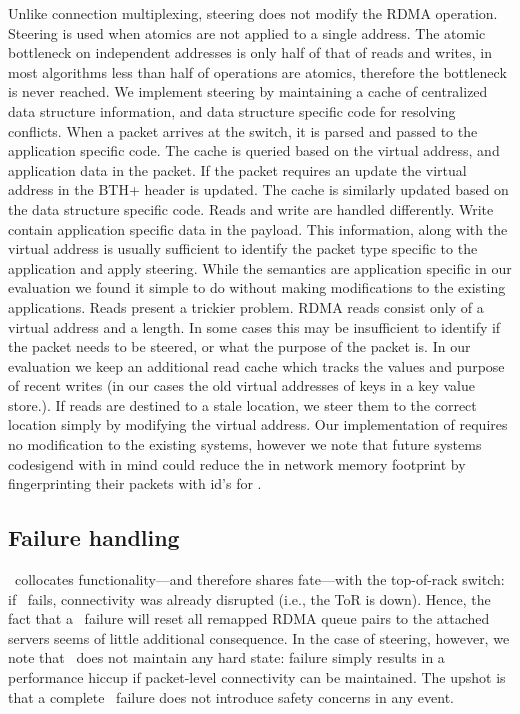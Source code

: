 Unlike connection multiplexing, steering does not modify the
RDMA operation. Steering is used when atomics are not
applied to a single address. The atomic bottleneck on
independent addresses is only half of that of reads and
writes, in most algorithms less than half of operations are
atomics, therefore the bottleneck is never reached. 
We implement steering by maintaining a cache of centralized
data structure information, and data structure specific code
for resolving conflicts. When a packet arrives at the
switch, it is parsed and passed to the application specific
code. The cache is queried based on the virtual address, and
application data in the packet. If the packet requires an
update the virtual address in the BTH+ header is updated.
The cache is similarly updated based on the data structure
specific code.
Reads and write are handled differently. Write contain
application specific data in the payload. This information,
along with the virtual address is usually sufficient to
identify the packet type specific to the application and
apply steering. While the semantics are application specific
in our evaluation we found it simple to do without making
modifications to the existing applications.
Reads present a trickier problem. RDMA reads consist only of
a virtual address and a length. In some cases this may be
insufficient to identify if the packet needs to be steered,
or what the purpose of the packet is. In our evaluation we
keep an additional read cache which tracks the values and
purpose of recent writes (in our cases the old virtual
addresses of keys in a key value store.). If reads are
destined to a stale location, we steer them to the correct
location simply by modifying the virtual address.
Our implementation of \sword requires no modification to the
existing systems, however we note that future systems
codesigend with \sword in mind could reduce the in network
memory footprint by fingerprinting their packets with id's
for {\sword}.

\subsection{Failure handling}

\sword\ collocates functionality---and therefore shares fate---with the
top-of-rack switch: if \sword\ fails, connectivity was already
disrupted (i.e., the ToR is down).  Hence, the fact that a
\sword\ failure will reset all remapped RDMA queue pairs to the
attached servers seems of little additional consequence.  In the case
of steering, however, we note that \sword\ does not maintain any hard
state: failure simply results in a performance hiccup if packet-level
connectivity can be maintained.  The upshot is that a complete
\sword\ failure does not introduce safety concerns in any event.

